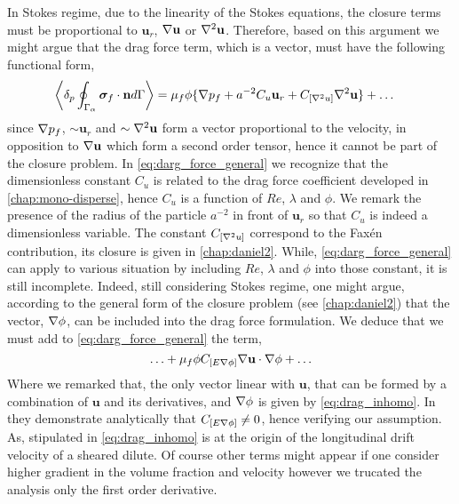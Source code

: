 In Stokes regime, due to the linearity of the Stokes equations, the closure terms must be proportional to $\textbf{u}_{r}$, $\mathbf{\nabla} \textbf{u}$ or $\mathbf{\nabla}^2 \textbf{u}$. 
Therefore, based on this argument we might argue that the drag force term, which is a vector, must have the following functional form, 
\begin{align}
    \pSavg{\bm\sigma_f\cdot \textbf{n}} &= 
    \mu_f \phi \{
    \grad p_f
    + 
    a^{-2}
    C_u \textbf{u}_{r}
    +C_{[\grad^2 u]} \grad^2 \textbf{u}
    \} + \ldots
    \label{eq:darg_force_general}
\end{align}
since $\mathbf{\nabla} p_f$, $\sim \textbf{u}_r$ and  $\sim \mathbf{\nabla}^2 \textbf{u}$ form a vector proportional to the velocity, in opposition to $\mathbf{\nabla} \textbf{u}$ which form a second order tensor, hence it cannot be part of the closure problem. 
In \ref{eq:darg_force_general} we recognize that the dimensionless constant $C_u$ is related to the drag force coefficient developed in \ref{chap:mono-disperse}, hence $C_u$ is a function of $Re$, $\lambda$ and $\phi$.
We remark the presence of the radius of the particle $a^{-2}$ in front of $\textbf{u}_r$ so that $C_u$ is indeed a dimensionless variable. 
The constant $C_{[\mathbf{\nabla}^2 u]}$ correspond to the Fax\'en contribution, its closure is given in \ref{chap:daniel2}.
While, \ref{eq:darg_force_general} can apply to various situation by including $Re$, $\lambda$ and $\phi$ into those constant, it is still incomplete. 
Indeed, still considering Stokes regime, one might argue, according to the general form of the closure problem (see \ref{chap:daniel2}) that the vector, $\mathbf{\nabla} \phi$, can be included into the drag force formulation. 
We deduce that we must add to \ref{eq:darg_force_general} the term, 
\begin{equation}
    \ldots 
    +
    \mu_f \phi C_{[E \grad\phi ]} \grad \textbf{u} \cdot \grad \phi + \ldots
    \label{eq:drag_inhomo}
\end{equation}
Where we remarked that, the only vector linear with $\textbf{u}$, that can be formed by a combination of $\textbf{u}$ and its derivatives, and $\mathbf{\nabla} \phi$ is given by \ref{eq:drag_inhomo}. 
In \citet{wang1999longitudinal} they demonstrate analytically that $C_{[E \mathbf{\nabla}\phi ]}\neq 0$, hence verifying our assumption. 
As, stipulated in \citet{wang1999longitudinal} \ref{eq:drag_inhomo} is at the origin of the longitudinal drift velocity of a sheared dilute. 
Of course other terms might appear if one consider higher gradient in the volume fraction and velocity however we trucated the analysis only the first order derivative. 

